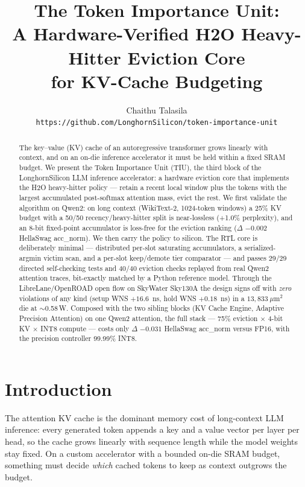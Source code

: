 \documentclass[10pt,twocolumn]{article}
\title{\textbf{The Token Importance Unit:\\
A Hardware-Verified H2O Heavy-Hitter Eviction Core\\
for KV-Cache Budgeting}}
\author{
  Chaithu Talasila\\
  \texttt{https://github.com/LonghornSilicon/token-importance-unit}
}
\date{}
\begin{document}
\maketitle
\thispagestyle{fancy}

\begin{abstract}
The key--value (KV) cache of an autoregressive transformer grows linearly with
context, and on an on-die inference accelerator it must be held within a fixed
SRAM budget. We present the Token Importance Unit (TIU), the third block of the
LonghornSilicon LLM inference accelerator: a hardware eviction core that
implements the H2O heavy-hitter policy \citep{zhang2023h2o} --- retain a recent
local window plus the tokens with the largest accumulated post-softmax attention
mass, evict the rest. We first validate the algorithm on Qwen2: on long context
(WikiText-2, 1024-token windows) a 25\% KV budget with a 50/50 recency/heavy-hitter
split is near-lossless (+1.0\% perplexity), and an 8-bit fixed-point accumulator
is loss-free for the eviction ranking ($\Delta$ $-0.002$ HellaSwag acc\_norm). We
then carry the policy to silicon. The RTL core is deliberately minimal ---
distributed per-slot saturating accumulators, a serialized-argmin victim scan, and
a per-slot keep/demote tier comparator --- and passes 29/29 directed self-checking
tests and 40/40 eviction checks replayed from real Qwen2 attention traces,
bit-exactly matched by a Python reference model. Through the LibreLane/OpenROAD
open flow on SkyWater Sky130A the design signs off with \emph{zero} violations of
any kind (setup WNS $+16.6$~ns, hold WNS $+0.18$~ns) in a $13{,}833~\mu$m$^2$ die
at $\sim$0.58\,\textmu W. Composed with the two sibling blocks (KV Cache Engine,
Adaptive Precision Attention) on one Qwen2 attention, the full stack --- 75\%
eviction $\times$ 4-bit KV $\times$ INT8 compute --- costs only $\Delta$ $-0.031$
HellaSwag acc\_norm versus FP16, with the precision controller 99.99\% INT8.
\end{abstract}

\section{Introduction}

The attention KV cache is the dominant memory cost of long-context LLM inference:
every generated token appends a key and a value vector per layer per head, so the
cache grows linearly with sequence length while the model weights stay fixed. On a
custom accelerator with a bounded on-die SRAM budget, something must decide
\emph{which} cached tokens to keep as context outgrows the budget.
\end{document}
